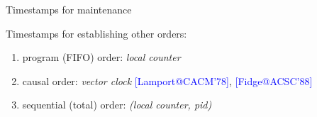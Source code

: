 \documentclass{beamer}
\makeatletter
\newcommand{\citeinbeamer}[3]{{\scriptsize{\textcolor{blue}{[#1@#2'#3]}}}}
\newcommand{\fig}[3]
{
  \begin{figure}[htp]
    \centering
      \texttt{[image: \#2]}
      \caption[labelInTOC]{#3}
  \end{figure}
}
\newcommand{\timestamp}[1]{\emph{\sffamily #1}}
\makeatother
\begin{document}
\begin{frame}{Timestamps for maintenance}
  \begin{block}{Timestamps for establishing other orders:}
  \begin{enumerate}
    \item program (FIFO) order: \timestamp{local counter}
    \item causal order: \timestamp{vector clock}
    \citeinbeamer{Lamport}{CACM}{78}, \citeinbeamer{Fidge}{ACSC}{88}
    \item sequential (total) order: \timestamp{(local counter, pid)}
  \end{enumerate}
  \end{block}
\end{frame}
\end{document}
